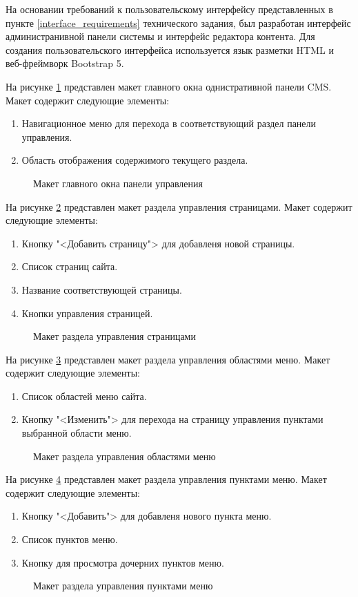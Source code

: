 На основании требований к пользовательскому интерфейсу представленных в пункте \ref{interface_requirements} технического задания, был разработан интерфейс администранивной панели системы и интерфейс редактора контента. Для создания пользовательского интерфейса используется язык разметки HTML и веб-фреймворк Bootstrap 5.

На рисунке \ref{ui1:image} представлен макет главного окна однистративной панели CMS. Макет содержит следующие элементы:
\begin{enumerate}
	\item Навигационное меню для перехода в соответствующий раздел панели управления.
	\item Область отображения содержимого текущего раздела.
\end{enumerate}
\begin{figure}[ht]
	\center{\texttt{[image: ui1]}}
	\caption{Макет главного окна панели управления}
	\label{ui1:image}
\end{figure}
На рисунке \ref{ui2:image} представлен макет раздела управления страницами. Макет содержит следующие элементы:
\begin{enumerate}
	\item Кнопку "<Добавить страницу"> для добавленя новой страницы.
	\item Список страниц сайта.
	\item Название соответствующей страницы.
	\item Кнопки управления страницей.
\end{enumerate}
\begin{figure}[ht]
	\center{\texttt{[image: ui2]}}
	\caption{Макет раздела управления страницами}
	\label{ui2:image}
\end{figure}
На рисунке \ref{ui3:image} представлен макет раздела управления областями меню. Макет содержит следующие элементы:
\begin{enumerate}
	\item Список областей меню сайта.
	\item Кнопку "<Изменить"> для перехода на страницу управления пунктами выбранной области меню.
\end{enumerate}
\begin{figure}[ht]
	\center{\texttt{[image: ui3]}}
	\caption{Макет раздела управления областями меню}
	\label{ui3:image}
\end{figure}
На рисунке \ref{ui4:image} представлен макет раздела управления пунктами меню. Макет содержит следующие элементы:
\begin{enumerate}
	\item Кнопку "<Добавить"> для добавленя нового пункта меню.
	\item Список пунктов меню.
	\item Кнопку для просмотра дочерних пунктов меню.
\end{enumerate}
\begin{figure}[ht]
	\center{\texttt{[image: ui4]}}
	\caption{Макет раздела управления пунктами меню}
	\label{ui4:image}
\end{figure}